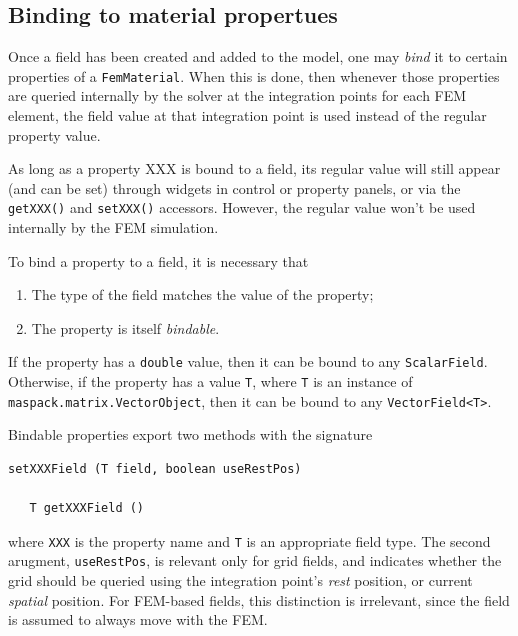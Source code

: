 \subsection{Binding to material propertues}

Once a field has been created and added to the model, one may {\it
bind} it to certain properties of a {\tt FemMaterial}. When this is
done, then whenever those properties are queried internally by the
solver at the integration points for each FEM element, the field value
at that integration point is used instead of the regular property
value.

\begin{sideblock}
As long as a property {\sf XXX} is bound to a field, its regular value will
still appear (and can be set) through widgets in control or property
panels, or via the {\tt getXXX()} and {\tt setXXX()} accessors.
However, the regular value won't be used internally by the FEM
simulation.
\end{sideblock}

To bind a property to a field, it is necessary that 

\begin{enumerate}

\item The type of the field matches the value of the property;

\item The property is itself {\it bindable}.

\end{enumerate}

If the property has a {\tt double} value, then it can be bound to any
{\tt ScalarField}. Otherwise, if the property has a value {\tt T},
where {\tt T} is an instance of {\tt maspack.matrix.VectorObject},
then it can be bound to any {\tt VectorField<T>}.

Bindable properties export two methods with the signature
%
\begin{lstlisting}[]
   setXXXField (T field, boolean useRestPos)

   T getXXXField ()
\end{lstlisting}
%
where {\tt XXX} is the property name and {\tt T} is an appropriate
field type. The second arugment, {\tt useRestPos}, is relevant only
for grid fields, and indicates whether the grid should be queried
using the integration point's {\it rest} position, or current {\it
spatial} position. For FEM-based fields, this distinction is
irrelevant, since the field is assumed to always move with the FEM.

